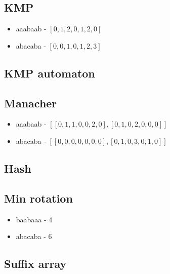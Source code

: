 
\subsection{KMP }

\begin{itemize}[noitemsep]
  \item aaabaab - $[0, 1, 2, 0, 1, 2, 0]$
  \item abacaba - $[0, 0, 1, 0, 1, 2, 3]$
\end{itemize}

\subsection{KMP automaton }


\subsection{Manacher }

\begin{itemize}[noitemsep]
  \item aaabaab - $[[0, 1, 1, 0, 0, 2, 0], [0, 1, 0, 2, 0, 0, 0]]$
  \item abacaba - $[[0, 0, 0, 0, 0, 0, 0], [0, 1, 0, 3, 0, 1, 0]]$
\end{itemize}

\subsection{Hash }


\subsection{Min rotation }

\begin{itemize}[noitemsep]
  \item baabaaa - $4$
  \item abacaba - $6$
\end{itemize}

\subsection{Suffix array }

